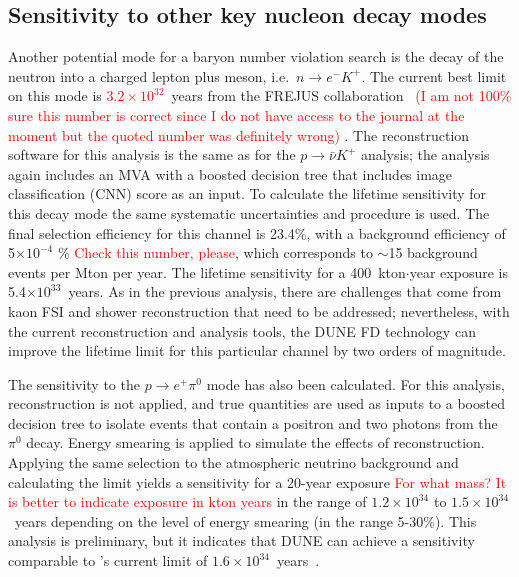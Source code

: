 \subsection{Sensitivity to other key nucleon decay modes}
\label{subsec:nonaccel-ndk-other}

Another potential mode for a baryon number violation search is the decay of the neutron into a charged lepton plus meson, i.e.~$n\rightarrow e^{-}K^{+}$. The current best limit on this mode is 
\textcolor{red}{$3.2\times 10^{32}$}~years from the FREJUS collaboration~\cite{Berger:1991fa} \textcolor{red}{(I am not 100\% sure this number is correct since I do not have access to the journal at the moment but the quoted number was definitely wrong)} .  The reconstruction software for this analysis is the same as for the $p\rightarrow \bar{\nu} K^{+} $ analysis; the analysis again includes an MVA with a boosted decision tree that includes image classification (CNN) score as an input. To calculate the lifetime sensitivity for this decay mode the same systematic uncertainties and procedure is used. The final selection efficiency for this channel is 23.4\%, with a background efficiency of 5$\times 10^{-4}$ \% \textcolor{red}{Check this number, please}, which corresponds to $\sim$15 background events per Mton per year. The lifetime sensitivity for a 400~kton$\cdot$year exposure is 5.4$\times 10^{33}$~years. As in the previous analysis, there are challenges that come from kaon FSI and shower reconstruction that need to be addressed; nevertheless, with the current reconstruction and analysis tools, the DUNE FD technology can improve the lifetime limit for this particular channel by two orders of magnitude.

The sensitivity to the $p \rightarrow e^{+} \pi^0$ mode has also been calculated. For this analysis, reconstruction is not applied, and true quantities are used as inputs to a boosted decision tree to isolate events that contain a positron and two photons from the $\pi^0$ decay.  Energy smearing is applied to simulate the effects of reconstruction.  Applying the same selection to the atmospheric neutrino background and calculating the limit yields a sensitivity for a 20-year exposure \textcolor{red}{For what mass? It is better to indicate exposure in kton years} in the range of $1.2 \times 10^{34}$ to $1.5 \times 10^{34}$~years depending on the level of energy smearing (in the range 5-30\%).  This analysis is preliminary, but it indicates that DUNE can achieve a sensitivity comparable to \superk's current limit of $1.6 \times 10^{34}$~years~\cite{Miura:2016krn}.

